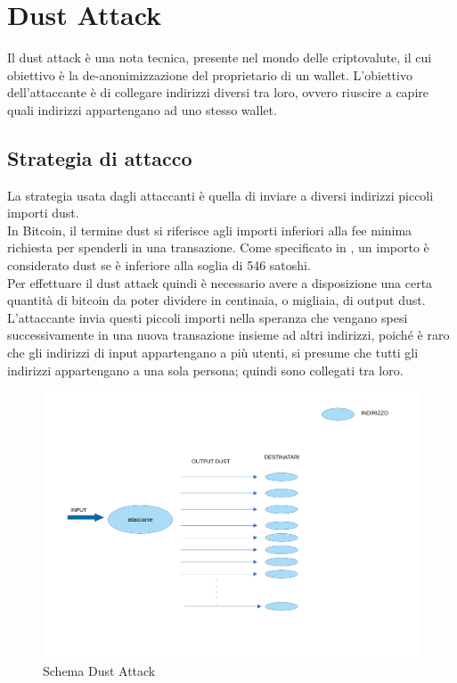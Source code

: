 \chapter{Dust Attack}
Il dust attack è una nota tecnica, presente nel mondo delle criptovalute, il cui obiettivo è la 
de-anonimizzazione del proprietario di un wallet. L'obiettivo dell'attaccante è di collegare indirizzi diversi tra loro, ovvero riuscire a capire quali indirizzi appartengano ad uno stesso wallet.\\

\section{Strategia di attacco}
La strategia usata dagli attaccanti è quella di inviare a diversi indirizzi piccoli importi dust.\\
In Bitcoin, il termine dust si riferisce agli importi inferiori alla fee minima richiesta per spenderli in una transazione. Come specificato in \cite{BtcDev}, un
importo è considerato dust se è inferiore alla soglia di 546 satoshi.\\
Per effettuare il dust attack quindi è necessario avere a disposizione una certa quantità di bitcoin da poter dividere in centinaia, o migliaia, di output dust.
L'attaccante invia questi piccoli importi nella speranza che vengano spesi successivamente in una nuova transazione insieme ad altri indirizzi, poiché è raro che gli indirizzi di input appartengano a più utenti, si presume che tutti gli indirizzi appartengano a una sola persona; quindi sono collegati tra loro.
\begin{figure}[h!]
    \centering
    \includegraphics[scale=0.5]{Images/dust_attack.pdf}
    \caption{Schema Dust Attack}
    \label{fig:Dust_attack}
\end{figure}
